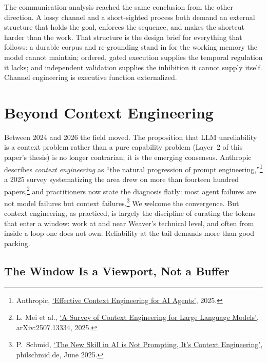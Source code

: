 \documentclass[11pt, a4paper]{article}
\begin{document}
The communication analysis reached the same conclusion from the other
direction. A lossy channel and a short-sighted process both demand an external structure
that holds the goal, enforces the sequence, and makes the shortcut harder than the work.
That structure is the design brief for everything that follows: a durable corpus and
re-grounding stand in for the working memory the model cannot maintain; ordered,
gated execution supplies the temporal regulation it lacks; and independent validation
supplies the inhibition it cannot supply itself. Channel engineering is executive
function externalized.


\section{Beyond Context Engineering}

Between 2024 and 2026 the field moved. The proposition that LLM unreliability is a
context problem rather than a pure capability problem (Layer~2 of this paper's
thesis) is no longer contrarian; it is the emerging consensus. Anthropic describes
\emph{context engineering} as ``the natural progression of prompt
engineering,''\footnote{Anthropic, \href{https://www.anthropic.com/engineering/effective-context-engineering-for-ai-agents}{`Effective Context Engineering for AI Agents'}, 2025.}
a 2025 survey systematizing the area drew on more than fourteen hundred
papers,\footnote{L. Mei et al., \href{https://arxiv.org/abs/2507.13334}{`A Survey of Context Engineering for Large Language Models'}, arXiv:2507.13334, 2025.}
and practitioners now state the diagnosis flatly: most agent failures are not model
failures but context failures.\footnote{P.~Schmid,
\href{https://www.philschmid.de/context-engineering}{`The New Skill in AI is Not
Prompting, It's Context Engineering'}, philschmid.de, June 2025.} We welcome the convergence. But context
engineering, as practiced, is largely the discipline of curating the tokens that enter a
window: work at and near Weaver's technical level, and often from inside a loop one does
not own. Reliability at the tail demands more than good packing.

\subsection*{The Window Is a Viewport, Not a Buffer}
\end{document}
